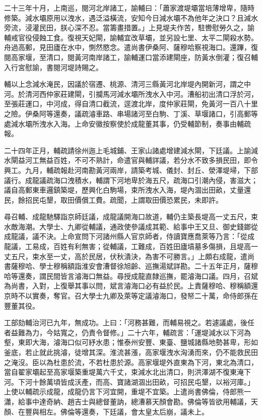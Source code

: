 \begin{pinyinscope}
二十三年十月，上南巡，閱河北岸諸工，諭輔曰：「蕭家渡堤壩當培薄增卑，隨時修築。減水壩原用以洩水，遇泛溢橫流，安知今日減水壩不為他年之決口？且減水旁流，浸灌民田，朕心深不忍。當籌畫措置。」上見堤夫作苦，駐轡慰勞久之，諭輔戒官役侵蝕工食。復視天妃閘，諭輔宜改草壩，並另設七里、太平二閘殺水勢。舟過高郵，見田廬在水中，惻然愍念。遣尚書伊桑阿、薩穆哈察視海口。還蹕，復閱高家堰，至清口，閱黃河南岸諸工，諭輔運口當添建閘座，防黃水倒灌；復召輔入行宮慰諭，書閱河堤詩賜之。

輔以上念減水淹民，因議於宿遷、桃源、清河三縣黃河北岸堤內開新河，謂之中河。於清河西仲家莊建閘，引攔馬河減水壩所洩水入中河。漕船初出清口浮於河，至張莊運口，中河成，得自清口截流，逕渡北岸，度仲家莊閘，免黃河一百八十里之險。伊桑阿等還奏，議疏濬車路、串場諸河至白駒、丁溪、草堰諸口，引高郵等處減水壩所洩水入海。上命安徽按察使於成龍董其事，仍受輔節制，奏事由輔疏報。

二十四年正月，輔疏請徐州迤上毛城鋪、王家山諸處增建減水閘，下廷議。上諭減水閘益河工無益百姓，不可不熟計，命遣官與輔詳議，若分水不致多損民田，即令興工。九月，輔疏報赴河南勘黃河兩岸，請築考城、儀封、封丘、滎澤堤埽，下部議行。成龍議疏海口洩積水，輔謂下河地卑於海五尺，疏海口引潮內侵，害滋大；議自高郵東車邏鎮築堤，歷興化白駒場，束所洩水入海，堤內涸出田畝，丈量還民，餘招民屯墾，取田價償工費。疏聞，上謂取田價恐累民，未即許。

尋召輔、成龍馳驛詣京師廷議，成龍議開海口故道，輔仍主築長堤高一丈五尺，束水敵海潮。大學士、九卿從輔議，通政使參議成其範、給事中王又旦、御史錢鎯從成龍議，議不決。上命宣問下河諸州縣人官京師者，侍讀寶應喬萊等乃言：「從成龍議，工易成，百姓有利無害；從輔議，工難成，百姓田廬墳墓多傷損，且堤高一丈五尺，束水至一丈，高於民居，伏秋潰決，為害不可勝言。」上頗右成龍，遣尚書薩穆哈、學士穆稱額詣淮安會漕督徐旭齡、巡撫湯斌詳勘。二十五年正月，薩穆哈等還奏，謂民間皆言濬海口無益。尋授成龍直隸巡撫，罷濬海口議。四月，召斌為尚書，入對，上復舉其事以問，斌言濬海口必有益於民。上責薩穆哈、穆稱額還京時不以實奏，奪官。召大學士九卿及萊等定議濬海口，發帑二十萬，命侍郎孫在豐董其役。

工部劾輔治河已九年，無成功。上曰：「河務甚難，而輔易視之。若遽議處，後任者益難為力，今姑寬之，仍責令督修。」二十六年，輔疏言：「運堤減水以下河為壑，東即大海，濬海口似可紓水患；惟泰州安豐、東臺、鹽城諸縣地勢甚卑，形如釜底，若止就此挑濬，徒增其深。淮流甚漲，高家堰洩水洶湧而來，仍不能救民田之淹沒。臣以為杜患於流，不若杜患於源。高家堰堤外直東為下河，東北為清口，當自翟家壩起至高家堰築重堤萬六千丈，束減水北出清口，則洪澤湖不復東淹下河。下河十餘萬頃皆成沃產，而高、寶諸湖涸出田畝，可招民屯墾，以裕河庫。」上使以輔疏示成龍，成龍仍言下河宜開，重堤不宜築。上遣尚書佛倫，侍郎熊一瀟，給事中達奇納、趙吉士與總督董訥，總漕慕天顏會勘。佛倫等皆欲用輔議，天顏、在豐與相左。佛倫等還奏，下廷議，會太皇太后崩，議未上。


\end{pinyinscope}
